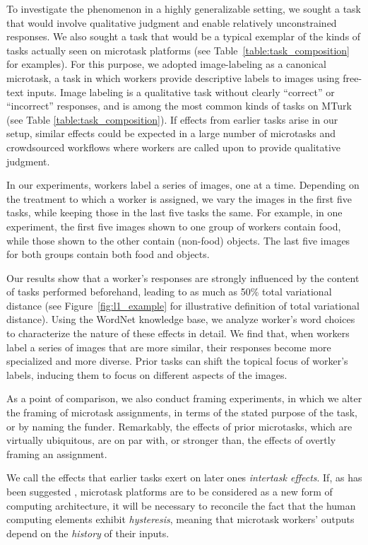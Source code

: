 \documentclass{sigchi}
\begin{document}
To investigate the phenomenon in a
highly generalizable setting, we sought a task that would involve 
qualitative judgment and enable relatively unconstrained responses. 
We also sought a task that would be a typical exemplar of the kinds of
tasks actually seen on microtask platforms (see 
Table~\ref{table:task_composition} for examples).  For this purpose, we 
adopted
image-labeling as a canonical microtask, a task in which workers provide 
descriptive labels to images using free-text inputs.  Image labeling is
a qualitative task without clearly ``correct'' or ``incorrect'' responses,
and is among the most common kinds of tasks on MTurk 
(see Table \ref{table:task_composition}).
If effects from earlier tasks arise in our setup, similar effects could be 
expected in 
a large number of microtasks and crowdsourced workflows where workers are 
called upon to provide qualitative judgment.

In our experiments, workers label a series of images, one at a time.
Depending on the treatment to which a worker is assigned, we vary the
images in the first five tasks, while keeping those in the last five tasks 
the same.  For example, in one experiment, the first five images shown to
one group of workers contain food, while those shown to the other 
contain (non-food) objects.  The last five images for both
groups contain both food and objects.

Our results show that a worker's responses are strongly influenced by 
the content of tasks performed beforehand, leading to as much as 50\%
total variational distance (see Figure~\ref{fig:l1_example} for 
illustrative definition of total variational distance).  
Using the WordNet 
knowledge base, we analyze worker's word choices to characterize 
the nature of these effects in detail.  We find that, when workers 
label a series of images that are more similar, their responses become 
more specialized and more diverse.  
Prior tasks can shift the topical focus of 
worker's labels, inducing them to focus on different aspects of the images.

As a point of comparison, we also conduct framing experiments, 
in which we alter the framing of microtask assignments, in terms of the 
stated purpose of the task, or by naming the funder.
Remarkably, the effects of prior microtasks,
which are virtually ubiquitous, are on par with, or stronger than, 
the effects of overtly framing an assignment.

We call the effects that earlier tasks exert on later ones 
\textit{intertask effects}.  If, as has been suggested \cite{5543192}, 
microtask platforms are to be considered as a new form of computing 
architecture, it will be necessary to reconcile the fact that the human 
computing elements exhibit \textit{hysteresis}, 
meaning that microtask workers' outputs 
depend on the \textit{history} of their inputs.
\end{document}
